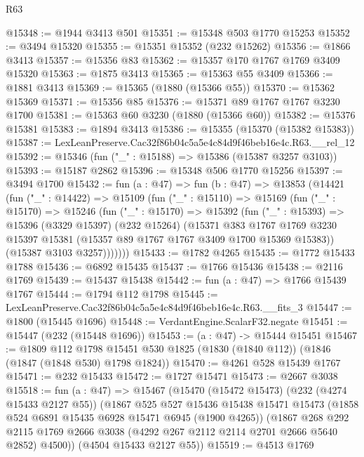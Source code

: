 \begin{lexlean}{R63}
\begin{coremodule}
@15348 := @1944 @3413 @501
@15351 := @15348 @503 @1770 @15253
@15352 := @3494 @15320
@15355 := @15351 @15352 (@232 @15262)
@15356 := @1866 @3413
@15357 := @15356 @83
@15362 := @15357 @170 @1767 @1769 @3409 @15320
@15363 := @1875 @3413
@15365 := @15363 @55 @3409
@15366 := @1881 @3413
@15369 := @15365 (@1880 (@15366 @55))
@15370 := @15362 @15369
@15371 := @15356 @85
@15376 := @15371 @89 @1767 @1767 @3230 @1700
@15381 := @15363 @60 @3230 (@1880 (@15366 @60))
@15382 := @15376 @15381
@15383 := @1894 @3413
@15386 := @15355 (@15370 (@15382 @15383))
@15387 := LexLeanPreserve.Cac32f86b04c5a5e4c84d9f46beb16e4c.R63.__rel_12
@15392 := @15346 (fun ("_" : @15188) => @15386 (@15387 @3257 @3103))
@15393 := @15187 @2862
@15396 := @15348 @506 @1770 @15256
@15397 := @3494 @1700
@15432 := fun (a : @47) =>
  fun (b : @47) =>
  @13853
    (@14421
      (fun ("_" : @14422) =>
      @15109
        (fun ("_" : @15110) =>
        @15169
          (fun ("_" : @15170) =>
          @15246
            (fun ("_" : @15170) =>
            @15392
              (fun ("_" : @15393) =>
              @15396
                (@3329 @15397)
                (@232 @15264)
                (@15371
                  @383
                  @1767
                  @1769
                  @3230
                  @15397
                  @15381
                  (@15357 @89 @1767 @1767 @3409 @1700 @15369 @15383))
                (@15387 @3103 @3257)))))))
@15433 := @1782 @4265
@15435 := @1772 @15433 @1788
@15436 := @6892 @15435
@15437 := @1766 @15436
@15438 := @2116 @1769
@15439 := @15437 @15438
@15442 := fun (a : @47) => @1766 @15439 @1767
@15444 := @1794 @112 @1798
@15445 := LexLeanPreserve.Cac32f86b04c5a5e4c84d9f46beb16e4c.R63.__fits_3
@15447 := @1800 (@15445 @1696)
@15448 := VerdantEngine.ScalarF32.negate
@15451 := @15447 (@232 (@15448 @1696))
@15453 := (a : @47) -> @15444 @15451
@15467 := @1809
    @112
    @1798
    @15451
    @530
    @1825
    (@1830 (@1840 @112))
    (@1846 (@1847 (@1848 @530) @1798 @1824))
@15470 := @4261 @528 @15439 @1767
@15471 := @232 @15433
@15472 := @1727 @15471
@15473 := @2667 @3038
@15518 := fun (a : @47) =>
  @15467
    (@15470
      (@15472 @15473)
      (@232 (@4274 @15433 @2127 @55))
      (@1867
        @525
        @527
        @15436
        @15438
        @15471
        @15473
        (@1858 @524 @6891 @15435 @6928 @15471 @6945 (@1900 @4265))
        (@1867
          @268
          @292
          @2115
          @1769
          @2666
          @3038
          (@4292 @267 @2112 @2114 @2701 @2666 @5640 @2852)
          @4500))
      (@4504 @15433 @2127 @55))
@15519 := @4513 @1769

\end{coremodule}
\end{lexlean}
